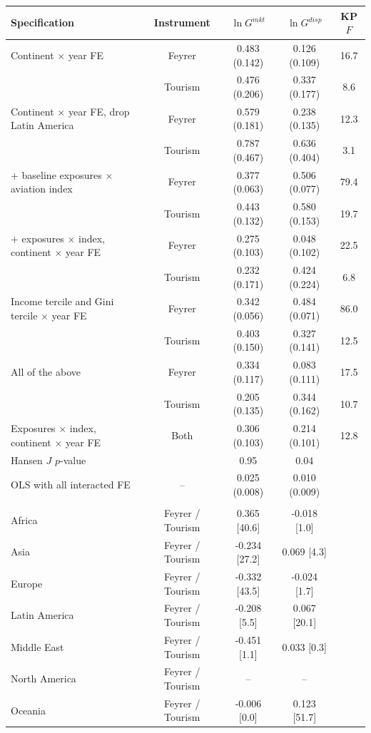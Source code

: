 \begin{tabular}{lcccc}
\toprule
Specification & Instrument & $\ln G^{mkt}$ & $\ln G^{disp}$ & KP $F$ \\
\midrule
Continent $\times$ year FE & Feyrer & 0.483\sym{***} (0.142) & 0.126 (0.109) & 16.7 \\
 & Tourism & 0.476\sym{**} (0.206) & 0.337\sym{*} (0.177) & 8.6 \\
Continent $\times$ year FE, drop Latin America & Feyrer & 0.579\sym{***} (0.181) & 0.238\sym{*} (0.135) & 12.3 \\
 & Tourism & 0.787\sym{*} (0.467) & 0.636 (0.404) & 3.1 \\
+ baseline exposures $\times$ aviation index & Feyrer & 0.377\sym{***} (0.063) & 0.506\sym{***} (0.077) & 79.4 \\
 & Tourism & 0.443\sym{***} (0.132) & 0.580\sym{***} (0.153) & 19.7 \\
+ exposures $\times$ index, continent $\times$ year FE & Feyrer & 0.275\sym{***} (0.103) & 0.048 (0.102) & 22.5 \\
 & Tourism & 0.232 (0.171) & 0.424\sym{*} (0.224) & 6.8 \\
Income tercile and Gini tercile $\times$ year FE & Feyrer & 0.342\sym{***} (0.056) & 0.484\sym{***} (0.071) & 86.0 \\
 & Tourism & 0.403\sym{***} (0.150) & 0.327\sym{**} (0.141) & 12.5 \\
All of the above & Feyrer & 0.334\sym{***} (0.117) & 0.083 (0.111) & 17.5 \\
 & Tourism & 0.205 (0.135) & 0.344\sym{**} (0.162) & 10.7 \\
Exposures $\times$ index, continent $\times$ year FE & Both & 0.306\sym{***} (0.103) & 0.214\sym{**} (0.101) & 12.8 \\
\quad Hansen $J$ $p$-value & & 0.95 & 0.04 & \\
OLS with all interacted FE & -- & 0.025\sym{***} (0.008) & 0.010 (0.009) & \\
\addlinespace\multicolumn{5}{l}{\emph{First stage by continent (coefficient on instrument, KP $F$)}}\\
Africa & Feyrer / Tourism & 0.365\sym{***} [40.6] & -0.018 [1.0] & \\
Asia & Feyrer / Tourism & -0.234\sym{***} [27.2] & 0.069\sym{**} [4.3] & \\
Europe & Feyrer / Tourism & -0.332\sym{***} [43.5] & -0.024 [1.7] & \\
Latin America & Feyrer / Tourism & -0.208\sym{**} [5.5] & 0.067\sym{***} [20.1] & \\
Middle East & Feyrer / Tourism & -0.451 [1.1] & 0.033 [0.3] & \\
North America & Feyrer / Tourism & -- & -- & \\
Oceania & Feyrer / Tourism & -0.006 [0.0] & 0.123\sym{***} [51.7] & \\
\bottomrule
\end{tabular}